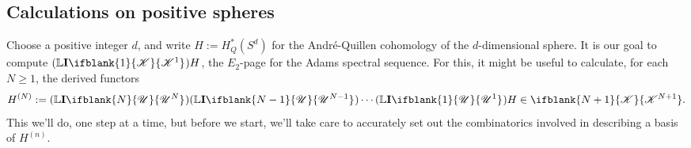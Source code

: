 \documentclass[10pt]{article}
\newcommand{\LL}[1]{\ifblank{#1}{\scrK}{\scrK^{#1}}}
\newcommand{\nontop}[1]{\ifblank{#1}{\scrU}{\scrU^{#1}}}
\newcommand{\Ind}[2][]{\mathbf{I}{#2}_{#1}}%
\newcommand{\derived}{\mathbb{L}}
\begin{document}
\begin{SequenceOfSequencesIntro}

\section{Calculations on positive spheres}
Choose a positive integer $d$, and write $H:=H^*_Q(S^d)$ for the Andr\'e-Quillen cohomology of the $d$-dimensional sphere. It is our goal to compute $(\derived\Ind{\LL{1}})H$, the $E_2$-page for the Adams spectral sequence. For this, it might be useful to calculate, for each $N\geq1$, the derived functors
\[H^{(N)}:=(\derived\Ind{\nontop{N}})(\derived\Ind{\nontop{N-1}})\cdots (\derived\Ind{\nontop{1}})H\in\LL{N+1}.\]
This we'll do, one step at a time, but before we start, we'll take care to accurately set out the combinatorics involved in describing a basis of $H^{(n)}$.


\end{SequenceOfSequencesIntro}
\end{document}
